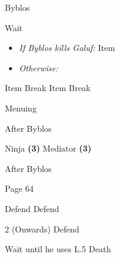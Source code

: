 \begin{paracol}{2}
\begin{boss}{Byblos}
    \varwb
    \begin{round}{1}
        \bartz Wait
        \begin{itemize}
            \item \textit{If Byblos kills Galuf:} Item \then \battleGroup{\phoenixDown}
            \item \textit{Otherwise:} 
        \end{itemize}
        \lenna Item \then {} \then Break
        \faris Item \then {} \then Break
    \end{round}
    \begin{bossPart}{Menuing}
        \item {}
        \item {}
        \vspace{1mm}
        \item[] 
    \end{bossPart}
    \varwe
\end{boss}

\switchcolumnTwice[*]
\begin{menu}{After Byblos}
    \begin{jobMenu}
        \faris Ninja \textbf{(3\pointRight)} \equip{\stealthRobe}
        \lenna Mediator \textbf{(3\pointLeft)} \ability{!\black}
    \end{jobMenu}
\end{menu}

\switchcolumn
\begin{steproute}{After Byblos}
\end{steproute}

\switchcolumn
\begin{encounter}{Page 64}
	\varwb
	\begin{notes}
		\item {}
	\end{notes}
	\begin{round}{1}
		\faris \leftCommand{\throw} \then \broadsword
        \bartz Defend
        \lenna \rightCommand{\black} \then \fire
        \galuf Defend
	\end{round}
    \begin{round}{2 (Onwards)}
		\faris \leftCommand{\throw} \then \mythrilKnife
        \bartz Defend
        \item Wait until he uses L.5 Death
        \lenna \leftCommand{\catch}
	\end{round}
	\varwe
\end{encounter}

\end{paracol}